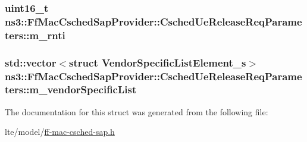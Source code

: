 \subsubsection[{\texorpdfstring{m\+\_\+rnti}{m_rnti}}]{\setlength{\rightskip}{0pt plus 5cm}uint16\+\_\+t ns3\+::\+Ff\+Mac\+Csched\+Sap\+Provider\+::\+Csched\+Ue\+Release\+Req\+Parameters\+::m\+\_\+rnti}\hypertarget{structns3_1_1FfMacCschedSapProvider_1_1CschedUeReleaseReqParameters_abfec7e9bba6da8096a378c520d78207b}{}\label{structns3_1_1FfMacCschedSapProvider_1_1CschedUeReleaseReqParameters_abfec7e9bba6da8096a378c520d78207b}
\subsubsection[{\texorpdfstring{m\+\_\+vendor\+Specific\+List}{m_vendorSpecificList}}]{\setlength{\rightskip}{0pt plus 5cm}std\+::vector$<$struct {\bf Vendor\+Specific\+List\+Element\+\_\+s}$>$ ns3\+::\+Ff\+Mac\+Csched\+Sap\+Provider\+::\+Csched\+Ue\+Release\+Req\+Parameters\+::m\+\_\+vendor\+Specific\+List}\hypertarget{structns3_1_1FfMacCschedSapProvider_1_1CschedUeReleaseReqParameters_a750428ae95523671f3c14d195e8738a6}{}\label{structns3_1_1FfMacCschedSapProvider_1_1CschedUeReleaseReqParameters_a750428ae95523671f3c14d195e8738a6}


The documentation for this struct was generated from the following file\+:\begin{DoxyCompactItemize}
\item 
lte/model/\hyperlink{ff-mac-csched-sap_8h}{ff-\/mac-\/csched-\/sap.\+h}\end{DoxyCompactItemize}
